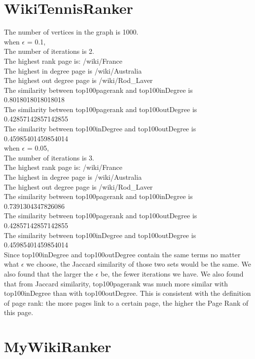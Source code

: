\documentclass{article}
\begin{document}
\section{WikiTennisRanker}
The number of vertices in the graph is 1000.\\
when $\epsilon$ = 0.1, \\
The number of iterations is 2.\\
The highest rank page is: /wiki/France\\
The highest in degree page is /wiki/Australia\\
The highest out degree page is /wiki/Rod\_Laver\\
The similarity between top100pagerank and top100inDegree is 0.8018018018018018\\
The similarity between top100pagerank and top100outDegree is 0.42857142857142855\\
The similarity between top100inDegree and top100outDegree is 0.45985401459854014\\
when $\epsilon$ = 0.05, \\
The number of iterations is 3.\\
The highest rank page is: /wiki/France\\
The highest in degree page is /wiki/Australia\\
The highest out degree page is /wiki/Rod\_Laver\\
The similarity between top100pagerank and top100inDegree is 0.7391304347826086\\
The similarity between top100pagerank and top100outDegree is 0.42857142857142855\\
The similarity between top100inDegree and top100outDegree is 0.45985401459854014  \\

Since top100inDegree and top100outDegree contain the same terms no matter what $\epsilon$ we choose, the Jaccard similarity of those two sets would be the same. We also found that the larger the $\epsilon$ be, the fewer iterations we have. We also found that from Jaccard similarity, top100pagerank was much more similar with top100inDegree than with top100outDegree. This is consistent with the definition of page rank: the more pages link to a certain page, the higher the Page Rank of this page.\\
\section{MyWikiRanker}
\end{document}
